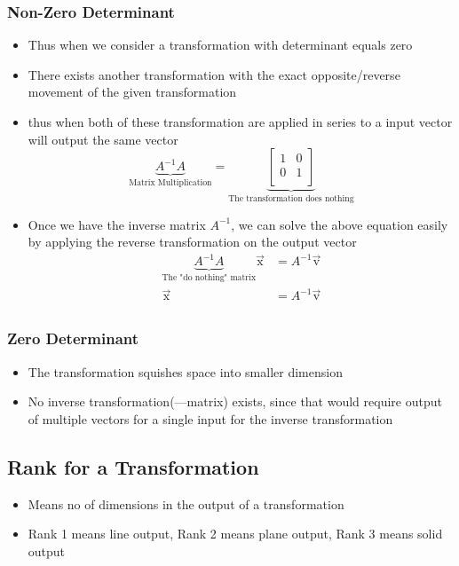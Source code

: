 \documentclass[a4paper]{article}
\begin{document}
\subsubsection{Non-Zero Determinant}
\begin{itemize}
	\item Thus when we consider a transformation with determinant equals zero
	\item There exists another transformation with the exact opposite/reverse
	      \linebreak movement of the given transformation
	\item thus when both of these transformation are applied in series
	      to a input vector will output the same vector
	      \[
		      \underbrace{A^{-1} A}
		      _{\text{Matrix Multiplication}}
		      = \underbrace{
			      \begin{bmatrix} 1 & 0 \\
                0 & 1 \\\end{bmatrix}
		      }_{\text{The transformation does nothing}}
	      \]
	\item Once we have the inverse matrix $A^{-1}$, we can solve the
	      above equation \newline easily by applying the
	      reverse transformation on the output vector
	      \begin{align*}
		      \underbrace{A^{-1} A }
		      _{\text{The "do nothing" matrix}}
		      \vec{\text{x}}
		       & = A^{-1} \vec{\text{v}} \\
		      \vec{\text{x}}
		       & = A^{-1} \vec{\text{v}} \\
	      \end{align*}
\end{itemize}

\subsubsection{Zero Determinant}
\begin{itemize}
	\item The transformation squishes space into smaller dimension
	\item No inverse transformation(---matrix) exists, since that
	      would require \newline output of multiple vectors for a
	      single input for the inverse transformation
\end{itemize}

\subsection{Rank for a Transformation}
\begin{itemize}
	\item Means no of dimensions in the output of a transformation
	\item Rank 1 means line output, \newline
	      Rank 2 means plane output, \newline
	      Rank 3 means solid output
\end{itemize}
\end{document}
